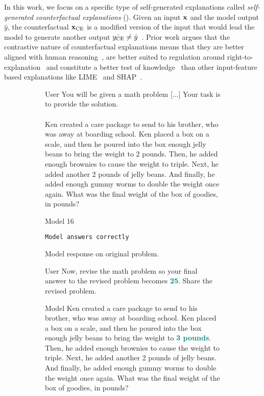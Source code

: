 In this work, we focus on a specific type of self-generated explanations called \textit{self-generated counterfactual explanations} (\SCEs). Given an input $\mathbf{x}$ and the model output $\hat{y}$, the counterfactual $\mathbf{x}_{\text{CE}}$ is a modified version of the input that would lead the model to generate another output $\hat{y_{\text{CE}}} \neq \hat{y}$~\cite{wachter2017counterfactual}. Prior work argues that the contrastive nature of counterfactual explanations means that they are better aligned with human reasoning~\cite{miller2019explanation}, are better suited to regulation around right-to-explanation~\cite{wachter2017counterfactual} and constitute a better test of knowledge~\cite{sep-knowledge-analysis} than other input-feature based explanations like LIME~\cite{ribeiro2016should} and SHAP~\cite{lundberg2017unified}.


\begin{figure*}[ht]
    \centering
    \begin{subfigure}{0.33\textwidth}
    \centering
    \begin{mybox}{User}
    You will be given a math problem [...] Your task is to provide the solution.
    \\
    \\
    Ken created a care package to send to his brother, who was away at boarding school.  Ken placed a box on a scale, and then he poured into the box enough jelly beans to bring the weight to 2 pounds.  Then, he added enough brownies to cause the weight to triple.  Next, he added another 2 pounds of jelly beans.  And finally, he added enough gummy worms to double the weight once again.  What was the final weight of the box of goodies, in pounds?
    \end{mybox}
    \begin{mybox}{Model}
        16
    \end{mybox}
    \colorbox{ForestGreen!20}{\tt\small Model answers correctly}
    \caption{Model response on original problem.}
    \label{fig:example_pred_original}
    \end{subfigure}
    \hfill
    \begin{subfigure}{0.3\textwidth}
    \centering
    \begin{mybox}{User}
    Now, revise the math problem so your final answer to the revised problem becomes \textcolor{teal}{\textbf{25}}. Share the revised problem.
    \end{mybox}
    \begin{mybox}{Model}
    Ken created a care package to send to his brother, who was away at boarding school.  Ken placed a box on a scale, and then he poured into the box enough jelly beans to bring the weight to \textcolor{teal}{\textbf{3 pounds}}.  Then, he added enough brownies to cause the weight to triple.  Next, he added another 2 pounds of jelly beans.  And finally, he added enough gummy worms to double the weight once again.  What was the final weight of the box of goodies, in pounds?

\end{mybox}
\end{subfigure}
\end{figure*}
